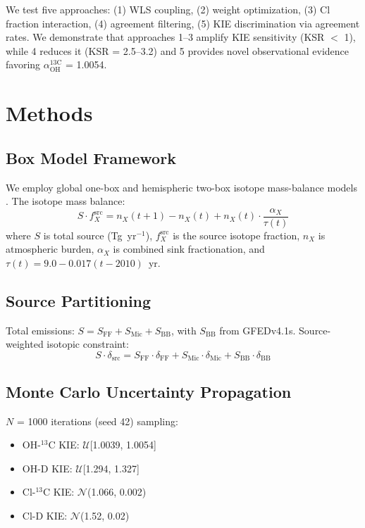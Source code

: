 \documentclass[11pt,twocolumn]{article}
\begin{document}
We test five approaches: (1) WLS coupling, (2) weight optimization, (3) Cl fraction interaction, (4) agreement filtering, (5) KIE discrimination via agreement rates. We demonstrate that approaches 1--3 amplify KIE sensitivity (KSR $<$ 1), while 4 reduces it (KSR = 2.5--3.2) and 5 provides novel observational evidence favoring $\alpha_{\mathrm{OH}}^{13\mathrm{C}}$ = 1.0054.

\section{Methods}

\subsection{Box Model Framework}

We employ global one-box and hemispheric two-box isotope mass-balance models \citep{Schwietzke2016,RiddellYoung2025,He2026Science}. The isotope mass balance:
\begin{equation}
S \cdot f_X^{\mathrm{src}} = n_X(t{+}1) - n_X(t) + n_X(t) \cdot \frac{\alpha_X}{\tau(t)}
\end{equation}
where $S$ is total source (Tg~yr$^{-1}$), $f_X^{\mathrm{src}}$ is the source isotope fraction, $n_X$ is atmospheric burden, $\alpha_X$ is combined sink fractionation, and $\tau(t) = 9.0 - 0.017(t - 2010)$~yr.

\subsection{Source Partitioning}

Total emissions: $S = S_{\mathrm{FF}} + S_{\mathrm{Mic}} + S_{\mathrm{BB}}$, with $S_{\mathrm{BB}}$ from GFEDv4.1s. Source-weighted isotopic constraint:
\begin{equation}
S \cdot \delta_{\mathrm{src}} = S_{\mathrm{FF}} \cdot \delta_{\mathrm{FF}} + S_{\mathrm{Mic}} \cdot \delta_{\mathrm{Mic}} + S_{\mathrm{BB}} \cdot \delta_{\mathrm{BB}}
\end{equation}

\subsection{Monte Carlo Uncertainty Propagation}

$N$ = 1000 iterations (seed 42) sampling:
\begin{itemize}
\item OH-$^{13}$C KIE: $\mathcal{U}$[1.0039, 1.0054]
\item OH-D KIE: $\mathcal{U}$[1.294, 1.327]
\item Cl-$^{13}$C KIE: $\mathcal{N}$(1.066, 0.002)
\item Cl-D KIE: $\mathcal{N}$(1.52, 0.02)
\end{itemize}
\end{document}
